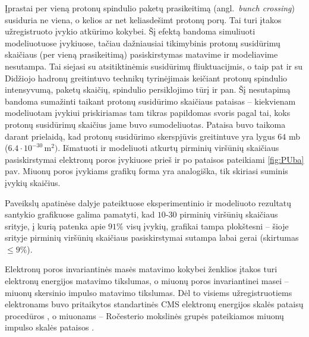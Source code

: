 \documentclass[a4paper, 12pt, oneside]{article}
\newlength\q
\begin{document}
Įprastai per vieną protonų spindulio paketų prasikeitimą (angl.\ \textit{bunch crossing}) susiduria
ne viena, o kelios ar net keliasdešimt protonų porų.
Tai turi įtakos užregistruoto įvykio atkūrimo kokybei.
Šį efektą bandoma simuliuoti modeliuotuose įvykiuose, tačiau dažniausiai tikimybinis protonų susidūrimų
skaičiaus (per vieną prasikeitimą) pasiskirstymas matavime ir modeliavime nesutampa.
Tai siejasi su atsitiktinėmis susidūrimų fliuktuacijmis, o taip pat ir su Didžiojo hadronų greitintuvo
technikų tyrinėjimais keičiant protonų spindulio intensyvumą, paketų skaičių, spindulio persiklojimo
tūrį ir pan.
Šį nesutapimą bandoma sumažinti taikant protonų susidūrimo skaičiaus pataisas -- kiekvienam modeliuotam
įvykiui priskiriamas tam tikras papildomas svoris pagal tai, koks protonų susidūrimų skaičius jame buvo sumodeliuotas.
Pataisa buvo taikoma darant prielaidą, kad protonų susidūrimo skerspjūvis greitintuve yra lygus $64$ mb
($6.4 \cdot 10^{-30} \, \mathrm{m}^2)$.
Išmatuoti ir modeliuoti atkurtų pirminių viršūnių skaičiaus pasiskirstymai elektronų poros įvykiuose
prieš ir po pataisos pateikiami \ref{fig:PUba} pav.
Miuonų poros įvykiams grafikų forma yra analogiška, tik skiriasi suminis įvykių skaičius.

Paveikslų apatinėse dalyje pateiktuose eksperimentinio ir modeliuoto rezultatų santykio grafikuose galima pamatyti, kad
$10$-$30$ pirminių viršūnių skaičiaus srityje, į kurią patenka apie $91\%$ visų įvykių, grafikai tampa plokštesni --
šioje srityje pirminių viršūnių skaičiaus pasiskirstymai sutampa labai gerai (skirtumas $\leqslant 9\%$).

Elektronų poros invariantinės masės matavimo kokybei ženklios įtakos turi elektronų energijos matavimo
tikslumas, o miuonų poros invariantinei masei -- miuonų skersinio impulso matavimo tikslumas.
Dėl to visiems užregistruotiems elektronams buvo pritaikytos standartinės CMS elektronų energijos skalės
pataisų procedūros \cite{Ecorr}, o miuonams -- Ročesterio mokslinės grupės pateikiamos miuonų impulso
skalės pataisos \cite{RocCorr}.
\end{document}
